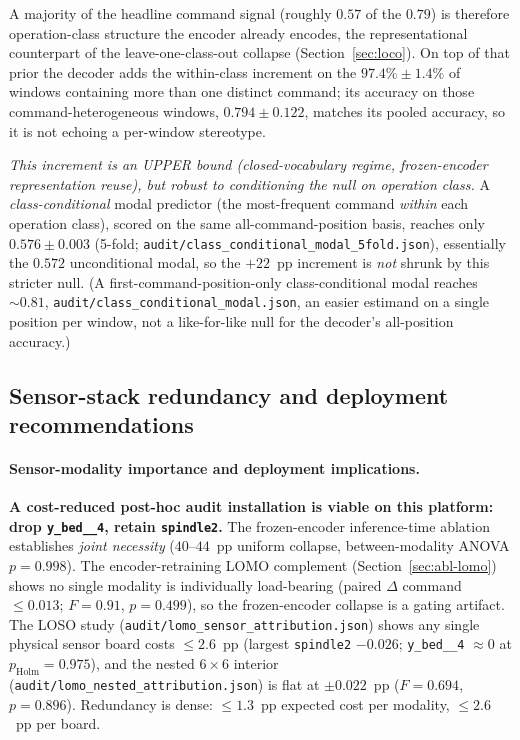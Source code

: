 \documentclass[sensors,article,submit,moreauthors,pdftex]{Definitions/mdpi}
\begin{document}
A majority of the headline command signal (roughly $0.57$ of the $0.79$) is therefore operation-class structure the encoder already encodes, the representational counterpart of the leave-one-class-out collapse (Section~\ref{sec:loco}). On top of that prior the decoder adds the within-class increment on the $97.4\% \pm 1.4\%$ of windows containing more than one distinct command; its accuracy on those command-heterogeneous windows, $0.794 \pm 0.122$, matches its pooled accuracy, so it is not echoing a per-window stereotype.

\emph{This increment is an UPPER bound (closed-vocabulary regime, frozen-encoder representation reuse), but robust to conditioning the null on operation class.} A \emph{class-conditional} modal predictor (the most-frequent command \emph{within} each operation class), scored on the same all-command-position basis, reaches only $0.576 \pm 0.003$ (5-fold; \texttt{audit/class\_conditional\_modal\_5fold.json}), essentially the $0.572$ unconditional modal, so the $+22$~pp increment is \emph{not} shrunk by this stricter null. (A first-command-position-only class-conditional modal reaches $\sim\!0.81$, \texttt{audit/class\_conditional\_modal.json}, an easier estimand on a single position per window, not a like-for-like null for the decoder's all-position accuracy.)

\subsection{Sensor-stack redundancy and deployment recommendations}
\label{sec:disc-deployment-stack}

\paragraph{Sensor-modality importance and deployment implications.}\label{sec:disc-modality}\hspace*{0pt plus 1fill}

\textbf{A cost-reduced post-hoc audit installation is viable on this platform: drop \texttt{y\_bed\_\_4}, retain \texttt{spindle2}.} The frozen-encoder inference-time ablation establishes \emph{joint necessity} ($40$--$44$~pp uniform collapse, between-modality ANOVA $p\!=\!0.998$). The encoder-retraining LOMO complement (Section~\ref{sec:abl-lomo}) shows no single modality is individually load-bearing (paired $\Delta$ command $\le\!0.013$; $F\!=\!0.91$, $p\!=\!0.499$), so the frozen-encoder collapse is a gating artifact. The LOSO study (\texttt{audit/lomo\_sensor\_attribution.json}) shows any single physical sensor board costs $\le\!2.6$~pp (largest \texttt{spindle2} $-0.026$; \texttt{y\_bed\_\_4} $\approx\!0$ at $p_{\text{Holm}}\!=\!0.975$), and the nested $6\!\times\!6$ interior (\texttt{audit/lomo\_nested\_attribution.json}) is flat at $\pm0.022$~pp ($F\!=\!0.694$, $p\!=\!0.896$). Redundancy is dense: $\le\!1.3$~pp expected cost per modality, $\le\!2.6$~pp per board.
\end{document}
